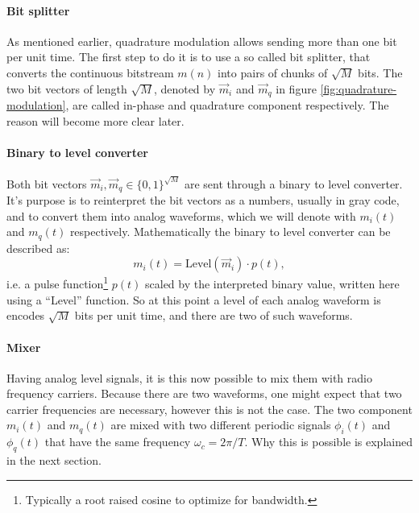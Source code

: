 \paragraph{Bit splitter}

As mentioned earlier, quadrature modulation allows sending more than one bit per unit time. The first step to do it is to use a so called bit splitter, that converts the continuous bitstream \(m(n)\) into pairs of chunks of \(\sqrt{M}\) bits. The two bit vectors of length \(\sqrt{M}\), denoted by \(\vec{m}_i\) and \(\vec{m}_q\) in figure \ref{fig:quadrature-modulation}, are called in-phase and quadrature component respectively. The reason will become more clear later.

\paragraph{Binary to level converter}


Both bit vectors \(\vec{m}_i, \vec{m}_q \in \{0,1\}^{\sqrt{M}}\) are sent through a binary to level converter. It's purpose is to reinterpret the bit vectors as a numbers, usually in gray code, and to convert them into analog waveforms, which we will denote with \(m_i(t)\) and \(m_q(t)\) respectively. Mathematically the binary to level converter can be described as:
\begin{equation}
	m_i(t) = \text{Level}(\vec{m}_i) \cdot p(t),
\end{equation}
i.e. a pulse function\footnote{Typically a root raised cosine to optimize for bandwidth.} \(p(t)\) scaled by the interpreted binary value, written here using a ``Level'' function. So at this point a level of each analog waveform is encodes \(\sqrt{M}\) bits per unit time, and there are two of such waveforms.


\paragraph{Mixer}

Having analog level signals, it is this now possible to mix them with radio frequency carriers. Because there are two waveforms, one might expect that two carrier frequencies are necessary, however this is not the case. The two component \(m_i(t)\) and \(m_q(t)\) are mixed with two different periodic signals \(\phi_i(t)\) and \(\phi_q(t)\) that have the same frequency \(\omega_c = 2\pi / T\). Why this is possible is explained in the next section.


